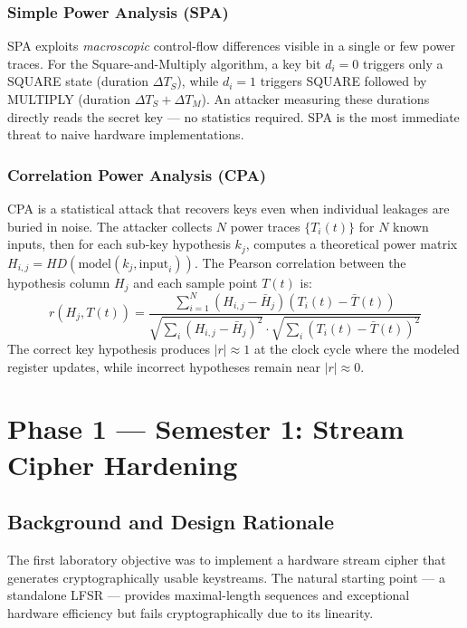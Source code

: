 \documentclass[conference, a4paper]{IEEEtran}
\begin{document}
\subsubsection*{Simple Power Analysis (SPA)}
SPA exploits \textit{macroscopic} control-flow differences visible in a single or few power traces. For the Square-and-Multiply algorithm, a key bit $d_i = 0$ triggers only a SQUARE state (duration $\Delta T_S$), while $d_i = 1$ triggers SQUARE followed by MULTIPLY (duration $\Delta T_S + \Delta T_M$). An attacker measuring these durations directly reads the secret key — no statistics required. SPA is the most immediate threat to naive hardware implementations.

\subsubsection*{Correlation Power Analysis (CPA)}
CPA \cite{b3} is a statistical attack that recovers keys even when individual leakages are buried in noise. The attacker collects $N$ power traces $\{T_i(t)\}$ for $N$ known inputs, then for each sub-key hypothesis $k_j$, computes a theoretical power matrix $H_{i,j} = HD(\text{model}(k_j, \text{input}_i))$. The Pearson correlation between the hypothesis column $H_j$ and each sample point $T(t)$ is:
\begin{equation}
    r(H_j, T(t)) = \frac{\sum_{i=1}^{N}(H_{i,j} - \bar{H}_j)(T_i(t) - \bar{T}(t))}{\sqrt{\sum_i(H_{i,j}-\bar{H}_j)^2} \cdot \sqrt{\sum_i(T_i(t)-\bar{T}(t))^2}}
\end{equation}
The correct key hypothesis produces $|r| \approx 1$ at the clock cycle where the modeled register updates, while incorrect hypotheses remain near $|r| \approx 0$.

\section{Phase 1 — Semester 1: Stream Cipher Hardening}
\label{sec:lfsr}

\subsection{Background and Design Rationale}

The first laboratory objective was to implement a hardware stream cipher that generates cryptographically usable keystreams. The natural starting point — a standalone LFSR — provides maximal-length sequences and exceptional hardware efficiency but fails cryptographically due to its linearity.
\end{document}
